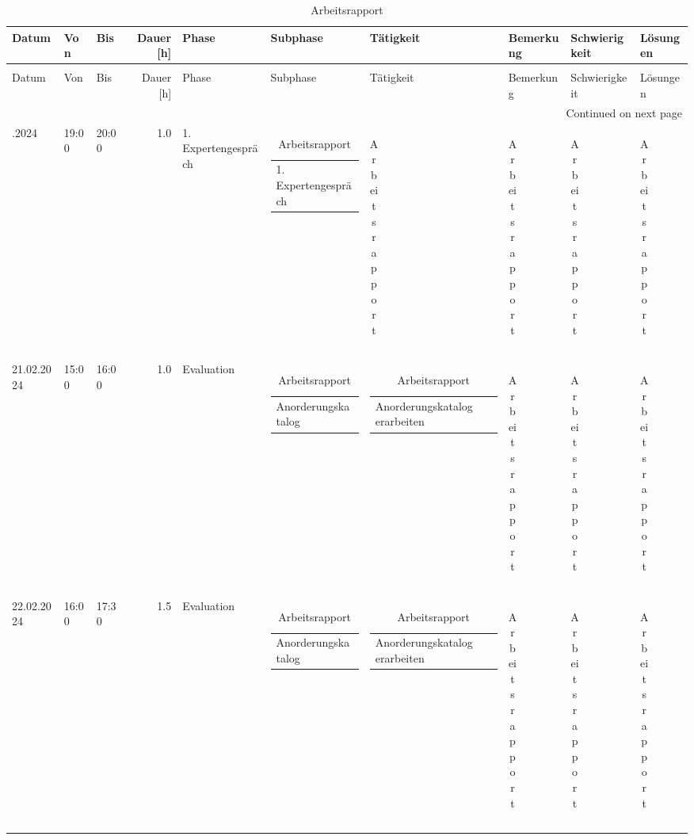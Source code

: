 {\tiny
\begin{longtable}[H]{lllrllllll}
 \midrule
\toprule
Datum & Von & Bis & Dauer [h] & Phase & Subphase & Tätigkeit & Bemerkung & Schwierigkeit & Lösungen \\ \midrule
\midrule
\endfirsthead
\caption[]{Arbeitsrapport} \\ \midrule
\toprule
Datum & Von & Bis & Dauer [h] & Phase & Subphase & Tätigkeit & Bemerkung & Schwierigkeit & Lösungen \\ \midrule
\midrule
\endhead
\midrule
\multicolumn{10}{r}{Continued on next page} \\ \midrule
\midrule
\endfoot
\bottomrule
\endlastfoot
14.02.2024 & 19:00 & 20:00 & 1.0 & 1. Expertengespräch & \begin{tabular}[c]{@{}l@{}}1. Expertengespräch\end{tabular} & \begin{tabular}[c]{@{}l@{}}\end{tabular} & \begin{tabular}[c]{@{}l@{}}\end{tabular} & \begin{tabular}[c]{@{}l@{}}\end{tabular} & \begin{tabular}[c]{@{}l@{}}\end{tabular} \\ \midrule
21.02.2024 & 15:00 & 16:00 & 1.0 & Evaluation & \begin{tabular}[c]{@{}l@{}}Anorderungskatalog\end{tabular} & \begin{tabular}[c]{@{}l@{}}Anorderungskatalog erarbeiten\end{tabular} & \begin{tabular}[c]{@{}l@{}}\end{tabular} & \begin{tabular}[c]{@{}l@{}}\end{tabular} & \begin{tabular}[c]{@{}l@{}}\end{tabular} \\ \midrule
22.02.2024 & 16:00 & 17:30 & 1.5 & Evaluation & \begin{tabular}[c]{@{}l@{}}Anorderungskatalog\end{tabular} & \begin{tabular}[c]{@{}l@{}}Anorderungskatalog erarbeiten\end{tabular} & \begin{tabular}[c]{@{}l@{}}\end{tabular} & \begin{tabular}[c]{@{}l@{}}\end{tabular} & \begin{tabular}[c]{@{}l@{}}\end{tabular} \\ \midrule

\end{longtable}}
